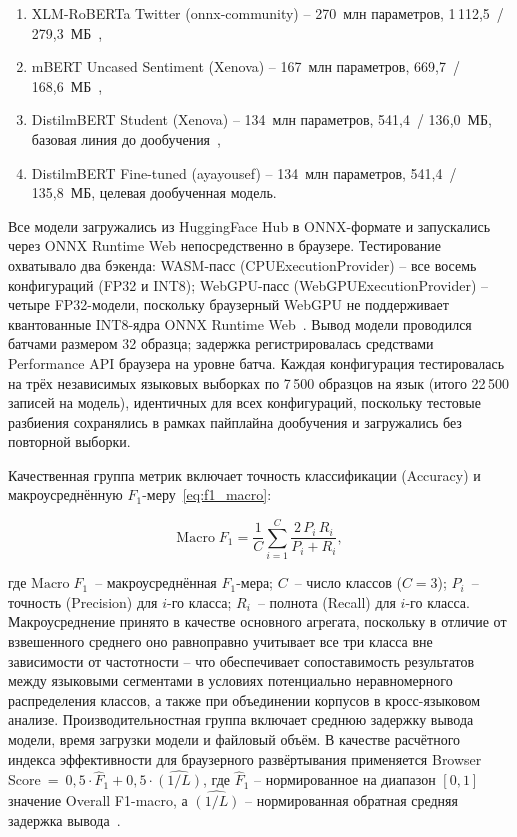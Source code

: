 \begin{enumerate}
    \item XLM-RoBERTa Twitter (onnx-community) – 270~млн параметров, 1\,112{,}5~/ 279{,}3~МБ~\cite{barbieri2022xlmroberta},
    \item mBERT Uncased Sentiment (Xenova) – 167~млн параметров, 669{,}7~/ 168{,}6~МБ~\cite{devlin2019bert},
    \item DistilmBERT Student (Xenova) – 134~млн параметров, 541{,}4~/ 136{,}0~МБ, базовая линия до дообучения~\cite{sanh2019distilbert},
    \item DistilmBERT Fine-tuned (ayayousef) – 134~млн параметров, 541{,}4~/ 135{,}8~МБ, целевая дообученная модель.
\end{enumerate}

Все модели загружались из HuggingFace Hub в ONNX-формате и запускались через ONNX Runtime Web непосредственно в браузере. Тестирование охватывало два бэкенда: WASM-пасс (CPUExecutionProvider) – все восемь конфигураций (FP32 и INT8); WebGPU-пасс (WebGPUExecutionProvider) – четыре FP32-модели, поскольку браузерный WebGPU не поддерживает квантованные INT8-ядра ONNX Runtime Web~\cite{wang2024anatomizing}. Вывод модели проводился батчами размером 32 образца; задержка регистрировалась средствами Performance API браузера на уровне батча. Каждая конфигурация тестировалась на трёх независимых языковых выборках по 7\,500 образцов на язык (итого 22\,500 записей на модель), идентичных для всех конфигураций, поскольку тестовые разбиения сохранялись в рамках пайплайна дообучения и загружались без повторной выборки.

Качественная группа метрик включает точность классификации (Accuracy) и макроусреднённую $F_1$-меру~\eqref{eq:f1_macro}:

\begin{equation}
    \text{Macro}\;F_1 = \frac{1}{C} \sum_{i=1}^{C} \frac{2\,P_i\,R_i}{P_i + R_i},
    \label{eq:f1_macro}
\end{equation}

\noindent где $\text{Macro}\;F_1$~– макроусреднённая $F_1$-мера; $C$~– число классов ($C = 3$); $P_i$~– точность (Precision) для $i$-го класса; $R_i$~– полнота (Recall) для $i$-го класса. Макроусреднение принято в качестве основного агрегата, поскольку в отличие от взвешенного среднего оно равноправно учитывает все три класса вне зависимости от частотности – что обеспечивает сопоставимость результатов между языковыми сегментами в условиях потенциально неравномерного распределения классов, а также при объединении корпусов в кросс-языковом анализе. Производительностная группа включает среднюю задержку вывода модели, время загрузки модели и файловый объём. В качестве расчётного индекса эффективности для браузерного развёртывания применяется Browser Score~=~$0{,}5 \cdot \hat{F}_1 + 0{,}5 \cdot \widehat{(1/L)}$, где $\hat{F}_1$ – нормированное на диапазон $[0, 1]$ значение Overall F1-macro, а $\widehat{(1/L)}$ – нормированная обратная средняя задержка вывода~\cite{xu2024ondevice}.

